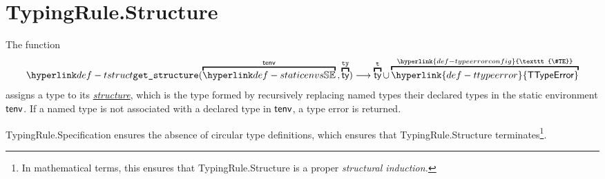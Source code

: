 \documentclass{book}
\newcommand\TTypeError[0]{\hyperlink{def-ttypeerror}{\textsf{TTypeError}}}
\newcommand\TypeErrorConfig[0]{\hyperlink{def-typeerrorconfig}{\texttt{\#TE}}}
\newcommand\structure[0]{\hyperlink{def-structure}{structure}}
\newcommand\vt[0]{\texttt{t}}
\newcommand\tty[0]{\texttt{ty}}
\begin{document}
\section{TypingRule.Structure \label{sec:structure}}
\hypertarget{def-structure}{}
The function
\[
  \tstruct(\overname{\staticenvs}{\tenv} \aslsep \overname{\ty}{\tty}) \aslto \overname{\ty}{\vt} \cup \overname{\TTypeError}{\TypeErrorConfig}
\]
assigns a type to its \hypertarget{def-tstruct}{\emph{\structure}}, which is the type formed by
recursively replacing named types their declared types in the static environment $\textsf{tenv}$.
If a named type is not associated with a declared type in $\textsf{tenv}$, a type error is returned.

TypingRule.Specification ensures the absence of circular type definitions,
which ensures that TypingRule.Structure terminates\footnote{In mathematical terms,
this ensures that TypingRule.Structure is a proper \emph{structural induction.}}.
\end{document}
